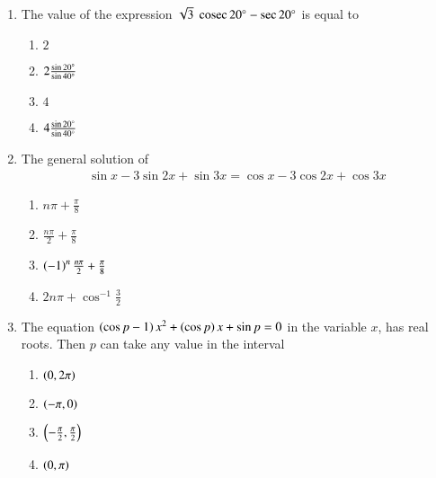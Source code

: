 \begin{enumerate}[label=\thesubsection.\arabic*,ref=\thesubsection.\theenumi]
    \item The value of the expression $\sqrt{3}\;\,\text{cosec}\,{20\degree}-\sec{20\degree}$ is equal to
        \hfill{}
        \begin{multicols}{4}
\begin{enumerate}
                \item $2$
                \item $2\frac{\sin{20\degree}}{\sin{40\degree}}$
                \item $4$
                \item $4\frac{\sin{20\degree}}{\sin{40\degree}}$
        \end{enumerate}
\end{multicols}
%
    \item The general solution of 
        \hfill{}
	\begin{align*}
		    \sin{x}-3\sin{2x} + \sin{3x} = \cos{x}-3\cos{2x} + \cos{3x}
	\end{align*}
        \begin{multicols}{4}
\begin{enumerate}
                \item $n\pi+\frac{\pi}{8}$
                \item $\frac{n\pi}{2}+\frac{\pi}{8}$
                \item $\left(-1\right)^n\frac{n\pi}{2}+\frac{\pi}{8}$
                \item $2n\pi+\cos^{-1}{\frac{3}{2}}$
        \end{enumerate}
\end{multicols}
    \item The equation $\left(\cos{p}-1\right)x^2+\left(\cos{p}\right)x+\sin{p}=0$ in the variable $x$, has real roots. Then $p$ can take any value in the interval
        \hfill{}
        \begin{multicols}{4}
\begin{enumerate}
                \item $\left(0,2\pi\right)$
                \item $\left(-\pi,0\right)$
                \item $\left(-\frac{\pi}{2},\frac{\pi}{2}\right)$  
                \item $\left(0,\pi\right)$
        \end{enumerate}
\end{multicols}


\end{enumerate}
